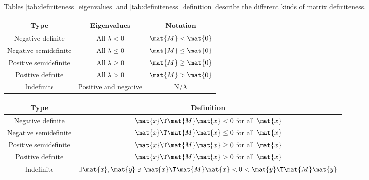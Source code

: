 Tables \ref{tab:definiteness_eigenvalues} and \ref{tab:definiteness_definition}
describe the different kinds of matrix definiteness.
\begin{booktable}
  \begin{tabular}{|ccc|}
    \hline
    \rowcolor{headingbg}
    \textbf{Type} & \textbf{Eigenvalues} & \textbf{Notation} \\
    \hline
    Negative definite &
      All $\lambda < 0$ &
      $\mat{M} < \mat{0}$ \\
    Negative semidefinite &
      All $\lambda \leq 0$ &
      $\mat{M} \leq \mat{0}$ \\
    Positive semidefinite &
      All $\lambda \geq 0$ &
      $\mat{M} \geq \mat{0}$ \\
    Positive definite &
      All $\lambda > 0$ &
      $\mat{M} > \mat{0}$ \\
    Indefinite &
      Positive and negative &
      N/A \\
    \hline
  \end{tabular}
  \caption{Eigenvalue distribution and notation for each type of matrix
    definiteness. Let $\mat{M}$ be a matrix.}
  \label{tab:definiteness_eigenvalues}
\end{booktable}
\begin{booktable}
  \begin{tabular}{|cc|}
    \hline
    \rowcolor{headingbg}
    \textbf{Type} & \textbf{Definition} \\
    \hline
    Negative definite &
      $\mat{x}\T\mat{M}\mat{x} < 0$ for all $\mat{x}$ \\
    Negative semidefinite &
      $\mat{x}\T\mat{M}\mat{x} \leq 0$ for all $\mat{x}$ \\
    Positive semidefinite &
      $\mat{x}\T\mat{M}\mat{x} \geq 0$ for all $\mat{x}$ \\
    Positive definite &
      $\mat{x}\T\mat{M}\mat{x} > 0$ for all $\mat{x}$ \\
    Indefinite &
      $\exists \mat{x}, \mat{y} \ni \mat{x}\T\mat{M}\mat{x} < 0 < \mat{y}\T\mat{M}\mat{y}$ \\
    \hline
  \end{tabular}
  \caption{Rigorous definition for each type of matrix definiteness. Let
    $\mat{M}$ be a matrix and let $\mat{x}$ and $\mat{y}$ be nonzero vectors.}
  \label{tab:definiteness_definition}
\end{booktable}
